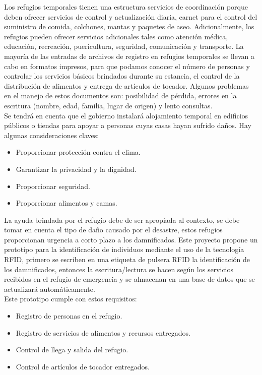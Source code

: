 \documentclass[11pt,openany]{book}
\newcounter{ns}
\begin{document}
	Los refugios temporales tienen una estructura servicios de coordinación porque deben ofrecer servicios de control y actualización diaria, carnet para el control del suministro de comida, colchones, mantas y paquetes de aseo. Adicionalmente, los refugios pueden ofrecer servicios adicionales tales como atención médica, educación, recreación, puericultura, seguridad, comunicación y  transporte. La mayoría de las entradas de archivos de registro en refugios temporales se llevan a cabo en formatos impresos, para que podamos conocer el número de personas y controlar los  servicios básicos brindados durante su estancia, el control de la distribución de alimentos y entrega de artículos de tocador. Algunos problemas en el manejo de estos documentos son: posibilidad de pérdida, errores en la escritura (nombre, edad, familia, lugar de origen) y lento consultas.\\
	Se tendrá en cuenta que el gobierno instalará alojamiento temporal en edificios públicos o tiendas para apoyar a personas cuyas casas hayan sufrido daños. Hay algunas consideraciones claves:
	\begin{itemize}
		\item Proporcionar protección contra el clima.
		\item Garantizar la privacidad y la dignidad.
		\item Proporcionar seguridad.
		\item Proporcionar alimentos y camas.
	\end{itemize}
	La ayuda brindada por el  refugio debe de ser apropiada al contexto, se debe tomar en cuenta el tipo de daño causado por el desastre, estos refugios proporcionan urgencia a corto plazo a los damnificados. Este proyecto propone un prototipo para la identificación de individuos mediante el uso de la tecnología RFID, primero se escriben en una etiqueta de pulsera RFID la identificación de los damnificados, entonces la escritura/lectura se hacen según los servicios recibidos en el refugio de emergencia y se almacenan en una base de datos que se actualizará automáticamente.\\
	Este prototipo cumple con estos requisitos:
	\begin{itemize}
		\item Registro de personas en el refugio.
		\item Registro de servicios de alimentos y recursos entregados.
		\item Control de llega y salida del refugio.
		\item Control de artículos de tocador entregados.
	\end{itemize}
\end{document}

